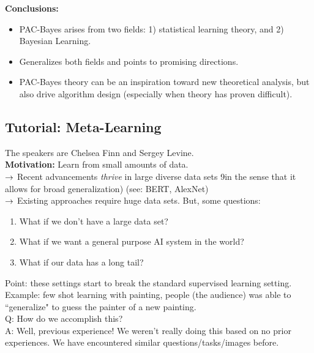 {\bf Conclusions:}
\begin{itemize}
    \item PAC-Bayes arises from two fields: 1) statistical learning theory, and 2) Bayesian Learning.
    \item Generalizes both fields and points to promising directions.
    \item PAC-Bayes theory can be an inspiration toward new theoretical analysis, but also drive algorithm design (especially when theory has proven difficult).
\end{itemize}


\spacerule

\subsection{Tutorial: Meta-Learning}

The speakers are Chelsea Finn and Sergey Levine. \\

{\bf Motivation:} Learn from small amounts of data. \\

$\rightarrow$ Recent advancements {\it thrive} in large diverse data sets 9in the sense that it allows for broad generalization) (see: BERT, AlexNet) \\

$\rightarrow$ Existing approaches require huge data sets. But, some questions:
\begin{enumerate}
\item  What if we don't have a large data set?
\item What if we want a general purpose AI system in the world?
\item What if our data has a long tail?
\end{enumerate}

Point: these settings start to break the standard supervised learning setting. \\

Example: few shot learning with painting, people (the audience) was able to ``generalize" to guess the painter of a new painting. \\

Q: How do we accomplish this? \\

A: Well, previous experience! We weren't really doing this based on no prior experiences. We have encountered similar questions/tasks/images before. \\

